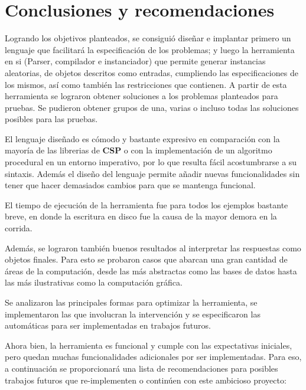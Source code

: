 \chapter{Conclusiones y recomendaciones} 

\label{chap:conclusiones}

Logrando los objetivos planteados, se consiguió diseñar e implantar primero un 
lenguaje que facilitará la especificación de los problemas; y luego la 
herramienta en si (Parser, compilador e instanciador)
que permite generar instancias aleatorias, de objetos descritos como entradas,
cumpliendo las especificaciones de los mismos, así como también las 
restricciones que contienen. A partir de esta herramienta se lograron obtener
soluciones a los problemas planteados para pruebas. Se pudieron obtener
grupos de una, varias o incluso todas las soluciones posibles para las pruebas.

El lenguaje diseñado es cómodo y bastante expresivo en comparación con la
mayoría de las librerias de \textbf{CSP} o con la implementación de un algoritmo
procedural en un entorno imperativo, por lo que resulta fácil
acostumbrarse a su sintaxis. Además el diseño del lenguaje permite añadir 
nuevas funcionalidades sin tener que hacer demasiados cambios para que
se mantenga funcional.

El tiempo de ejecución de la herramienta fue para todos los ejemplos bastante
breve, en donde la escritura en disco fue la causa de la mayor demora en la 
corrida.
 
Además, se lograron también buenos resultados al interpretar las respuestas como
objetos finales. Para esto se probaron casos que abarcan una gran cantidad de
áreas de la computación, desde las más abstractas como las bases de datos hasta
las más ilustrativas como la computación gráfica.

Se analizaron las principales formas para optimizar la herramienta, se 
implementaron las que involucran la intervención y se especificaron
las automáticas para ser implementadas en trabajos futuros.

Ahora bien, la herramienta es funcional y cumple con las expectativas
iniciales, pero quedan muchas funcionalidades adicionales por ser
implementadas. Para eso, a continuación se proporcionará una lista de recomendaciones 
para posibles trabajos futuros que re-implementen o continúen
con este ambicioso proyecto:


